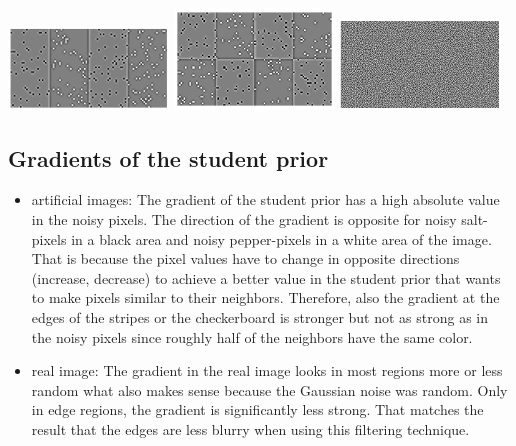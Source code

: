 \documentclass[a4paper,11pt, final]{scrartcl}
\begin{document}
{
\centering 
\includegraphics[width=0.32\textwidth]{ex4_stripes_grad.png}
\includegraphics[width=0.32\textwidth]{ex4_checker_grad.png}
\includegraphics[width=0.32\textwidth]{ex4_image_grad.png}
}

\vspace{1cm}

\subsection*{Gradients of the student prior}
\begin{itemize}
\item artificial images: The gradient of the student prior has a high absolute value in the noisy pixels. The direction of the gradient is opposite for noisy salt-pixels in a black area and noisy pepper-pixels in a white area of the image. That is because the pixel values have to change in opposite directions (increase, decrease) to achieve a better value in the student prior that wants to make pixels similar to their neighbors. Therefore, also the gradient at the edges of the stripes or the checkerboard is stronger but not as strong as in the noisy pixels since roughly half of the neighbors have the same color.
\item real image: The gradient in the real image looks in most regions more or less random what also makes sense because the Gaussian noise was random. Only in edge regions, the gradient is significantly less strong. That matches the result that the edges are less blurry when using this filtering technique.  
\end{itemize}
\end{document}
